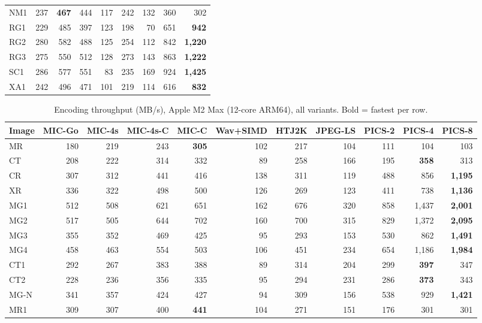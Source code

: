 \documentclass[journal]{IEEEtran}
\begin{document}
\begin{table}[htbp]
\begin{tabular}{lrrrrrrrr}
NM1 & 237 & \textbf{467} & 444 & 117 & 242 & 132 & 360 & 302 \\
RG1 & 229 & 485 & 397 & 123 & 198 & 70 & 651 & \textbf{942} \\
RG2 & 280 & 582 & 488 & 125 & 254 & 112 & 842 & \textbf{1,220} \\
RG3 & 275 & 550 & 512 & 128 & 273 & 143 & 863 & \textbf{1,222} \\
SC1 & 286 & 577 & 551 & 83 & 235 & 169 & 924 & \textbf{1,425} \\
XA1 & 242 & 496 & 471 & 101 & 219 & 114 & 616 & \textbf{832} \\
\bottomrule
\end{tabular}
\end{table}

\begin{table}[htbp]
\centering
\caption{Encoding throughput (MB/s), Apple M2 Max (12-core ARM64), all
variants. Bold = fastest per row.}
\label{tab:enc-arm64-full}
\scriptsize
\begin{tabular}{lrrrrrrrrrr}
\toprule
Image & MIC-Go & MIC-4s & MIC-4s-C & MIC-C & Wav+SIMD & HTJ2K & JPEG-LS & PICS-2 & PICS-4 & PICS-8 \\
\midrule
MR  & 180 & 219 & 243 & \textbf{305} & 102 & 217 & 104 & 111 & 104 & 103 \\
CT  & 208 & 222 & 314 & 332 & 89 & 258 & 166 & 195 & \textbf{358} & 313 \\
CR  & 307 & 312 & 441 & 416 & 138 & 311 & 119 & 488 & 856 & \textbf{1,195} \\
XR  & 336 & 322 & 498 & 500 & 126 & 269 & 123 & 411 & 738 & \textbf{1,136} \\
MG1 & 512 & 508 & 621 & 651 & 162 & 676 & 320 & 858 & 1,437 & \textbf{2,001} \\
MG2 & 517 & 505 & 644 & 702 & 160 & 700 & 315 & 829 & 1,372 & \textbf{2,095} \\
MG3 & 355 & 352 & 469 & 425 & 95 & 293 & 153 & 530 & 862 & \textbf{1,491} \\
MG4 & 458 & 463 & 554 & 503 & 106 & 451 & 234 & 654 & 1,186 & \textbf{1,984} \\
CT1 & 292 & 267 & 383 & 388 & 89 & 314 & 204 & 299 & \textbf{397} & 347 \\
CT2 & 228 & 236 & 356 & 335 & 95 & 294 & 231 & 286 & \textbf{373} & 343 \\
MG-N & 341 & 357 & 424 & 427 & 94 & 309 & 156 & 538 & 929 & \textbf{1,421} \\
MR1 & 309 & 307 & 400 & \textbf{441} & 104 & 271 & 151 & 176 & 301 & 301 \\

\end{tabular}
\end{table}
\end{document}
